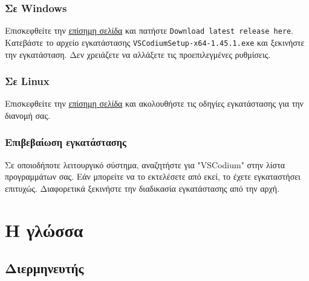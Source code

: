 \documentclass[a4paper,14pt]{extreport}
\begin{document}
\subsubsection{Σε Windows}
Επισκεφθείτε την \href{https://tinyurl.com/ybqxegq3}{επίσημη σελίδα} και πατήστε \lstinline{Download latest release here}. Κατεβάστε το αρχείο εγκατάστασης \lstinline{VSCodiumSetup-x64-1.45.1.exe} και ξεκινήστε την εγκατάσταση. Δεν χρειάζετε να αλλάξετε τις προεπιλεγμένες ρυθμίσεις.

\subsubsection{Σε Linux}
Επισκεφθείτε την \href{https://tinyurl.com/ybqxegq3}{επίσημη σελίδα} και
ακολουθήστε τις οδηγίες εγκατάστασης για την διανομή σας.

\subsubsection{Επιβεβαίωση εγκατάστασης}
Σε οποιοδήποτε λειτουργικό σύστημα, αναζητήστε για "VSCodium" στην λίστα
προγραμμάτων σας. Εάν μπορείτε να το εκτελέσετε από εκεί, το έχετε εγκαταστήσει
επιτυχώς. Διαφορετικά ξεκινήστε την διαδικασία εγκατάστασης από την αρχή.

\section{Η γλώσσα}
\subsection{Διερμηνευτής}
\end{document}

